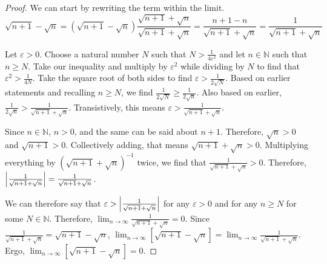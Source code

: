 \documentclass[11pt]{article}
\begin{document}
        \begin{proof}
            We can start by rewriting the term within the limit.
            \begin{equation}
                \sqrt{n + 1} - \sqrt{n} = (\sqrt{n + 1} - \sqrt{n}) \frac{\sqrt{n + 1} + \sqrt{n}}{\sqrt{n + 1} + \sqrt{n}}
                    =   \frac{n + 1 - n}{\sqrt{n + 1} + \sqrt{n}}
                    =   \frac{1}{\sqrt{n + 1} + \sqrt{n}}
            \end{equation}

            Let $\varepsilon > 0$.
            Choose a natural number $N$ such that $N > \frac{1}{4\varepsilon^2}$ and let $n \in \mathbb{N}$ such that $n \geq N$.
            Take our inequality and multiply by $\varepsilon^2$ while dividing by $N$ to find that $\varepsilon^2 > \frac{1}{4N}$.
            Take the square root of both sides to find $\varepsilon > \frac{1}{2\sqrt{N}}$.
            Based on earlier statements and recalling $n \geq N$, we find $\frac{1}{2\sqrt{N}} \geq \frac{1}{2\sqrt{n}}$.
            Also based on earlier, $\frac{1}{2\sqrt{n}} > \frac{1}{\sqrt{n + 1} + \sqrt{n}}$.
            Transistively, this means $\varepsilon > \frac{1}{\sqrt{n + 1} + \sqrt{n}}$.

            Since $n \in \mathbb{N}$, $n > 0$, and the same can be said about $n + 1$.
            Therefore, $\sqrt{n} > 0$ and $\sqrt{n + 1} > 0$.
            Collectively adding, that means $\sqrt{n + 1} + \sqrt{n} > 0$.
            Multiplying everything by $(\sqrt{n + 1} + \sqrt{n})^{-1}$ twice, we find that $\frac{1}{\sqrt{n + 1} + \sqrt{n}} > 0$.
            Therefore, $\left| \frac{1}{\sqrt{n + 1} + \sqrt{n}} \right| = \frac{1}{\sqrt{n + 1} + \sqrt{n}}$.

            We can therefore say that $\varepsilon > \left| \frac{1}{\sqrt{n + 1} + \sqrt{n}} \right|$ for any $\varepsilon > 0$ and for any $n \geq N$ for some $N \in \mathbb{N}$.
            Therefore, $\lim_{n \to \infty} \frac{1}{\sqrt{n + 1} + \sqrt{n}} = 0$.
            Since $\frac{1}{\sqrt{n + 1} + \sqrt{n}} = \sqrt{n + 1} - \sqrt{n}$, $\lim_{n \to \infty} \left[ \sqrt{n + 1} - \sqrt{n} \right] = \lim_{n \to \infty} \frac{1}{\sqrt{n + 1} + \sqrt{n}}$.
            Ergo, $\lim_{n \to \infty} \left[ \sqrt{n + 1} - \sqrt{n} \right] = 0$.
        \end{proof}
    \pagebreak
\end{document}
